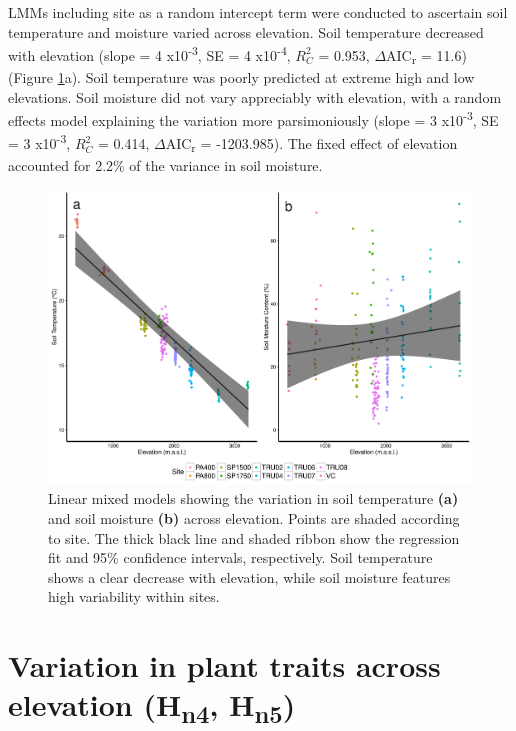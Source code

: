 \documentclass[a4paper,10pt,]{report}
\begin{document}
LMMs including site as a random intercept term were conducted to ascertain soil temperature and moisture varied across elevation. Soil temperature decreased with elevation (slope = 4 x10\textsuperscript{-3}, SE = 4 x10\textsuperscript{-4}, $R^2_C$ = 0.953, $\Delta$AIC\textsubscript{r} = 11.6) (Figure \ref{fig:temp_mois_fit}a). Soil temperature was poorly predicted at extreme high and low elevations. Soil moisture did not vary appreciably with elevation, with a random effects model explaining the variation more parsimoniously (slope = 3 x10\textsuperscript{-3}, SE = 3 x10\textsuperscript{-3}, $R^2_C$ = 0.414, $\Delta$AIC\textsubscript{r} = -1203.985). The fixed effect of elevation accounted for 2.2\% of the variance in soil moisture. 

\begin{figure}[H]
\centering
\includegraphics[scale=0.5]{temp_mois_fit.pdf}
\caption{Linear mixed models showing the variation in soil temperature \textbf{(a)} and soil moisture \textbf{(b)} across elevation. Points are shaded according to site. The thick black line and shaded ribbon show the regression fit and 95\% confidence intervals, respectively. Soil temperature shows a clear decrease with elevation, while soil moisture features high variability within sites.}
\label{fig:temp_mois_fit}
\end{figure}

\section{Variation in plant traits across elevation (H\textsubscript{n4}, H\textsubscript{n5})}
\end{document}
